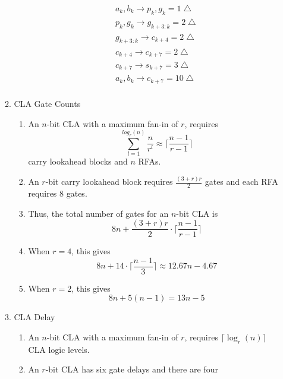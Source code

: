 \documentclass[times, twocolumn, 10pt]{article}
\begin{document}
\begin{enumerate}
\begin{enumerate}
\begin{enumerate}
      \begin{eqnarray*}
	a_{k}, b_{k} \rightarrow p_{k}, g_{k} = 1 \bigtriangleup \\
	p_{k}, g_{k} \rightarrow g_{k+3:k} = 2 \bigtriangleup \\
	g_{k+3:k} \rightarrow c_{k+4} = 2 \bigtriangleup \\
	c_{k+4} \rightarrow c_{k+7} = 2 \bigtriangleup \\
	c_{k+7} \rightarrow s_{k+7} = 3 \bigtriangleup \\
	a_{k}, b_{k} \rightarrow c_{k+7} = 10 \bigtriangleup \\
      \end{eqnarray*}
    \end{enumerate}
  \item CLA Gate Counts 
    \begin{enumerate}
    \item An $n$-bit CLA with a maximum fan-in of $r$, requires 
      \begin{displaymath}
	\sum_{l=1}^{log_{r}(n)} \frac{n}{r^{l}} \approx \lceil
	\frac{n-1}{r-1} \rceil 
      \end{displaymath}
      carry lookahead blocks and $n$ RFAs. 
    \item An $r$-bit carry lookahead block requires $\frac{(3 + r)r}{2}$
      gates and each RFA requires $8$ gates. 
    \item Thus, the total number of gates for an $n$-bit CLA is 
      \begin{displaymath}
        8n + \frac{(3 + r)r}{2} \cdot \lceil \frac{n-1}{r-1} \rceil
      \end{displaymath}
    \item When $r = 4$, this gives
      \begin{displaymath}
        8n + 14 \cdot \lceil \frac{n-1}{3} \rceil \approx 12.67n - 4.67
      \end{displaymath}
    \item When $r = 2$, this gives
      \begin{displaymath}
        8n + 5(n - 1) = 13n - 5
      \end{displaymath}
    \end{enumerate}
  \item CLA Delay
    \begin{enumerate}
    \item An $n$-bit CLA with a maximum fan-in of $r$, requires
      $\lceil \log_{r}(n) \rceil$
      CLA logic levels. 
    \item An $r$-bit CLA has six gate delays and there are four

\end{enumerate}
\end{enumerate}
\end{enumerate}
\end{document}
